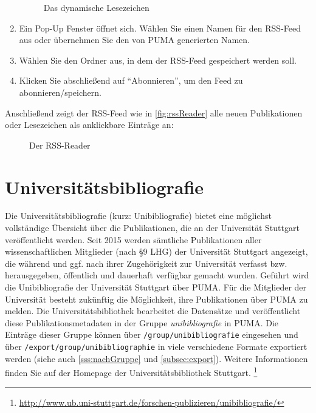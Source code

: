\begin{enumerate}
\begin{figure}[h!]
 \caption{Das dynamische Lesezeichen}
 \label{fig:dynamischesLesezeichen}
\end{figure}
    \item Ein Pop-Up Fenster öffnet sich. Wählen Sie einen Namen für den RSS-Feed aus oder übernehmen Sie den von PUMA generierten Namen. 
    \item Wählen Sie den Ordner aus, in dem der RSS-Feed gespeichert werden soll.
    \item Klicken Sie abschließend auf \enquote{Abonnieren}, um den Feed zu abonnieren/speichern.
\end{enumerate}
Anschließend zeigt der RSS-Feed wie in \autoref{fig:rssReader} alle neuen Publikationen oder Lesezeichen als anklickbare Einträge an:
\begin{figure}[h!]
 \centering
 \caption{Der RSS-Reader}
 \label{fig:rssReader}
\end{figure}
\section{Universitätsbibliografie}
\label{sec:unibibliografie}
Die Universitätsbibliografie (kurz: Unibibliografie) bietet eine möglichst vollständige Übersicht über die Publikationen, die an der Universität Stuttgart veröffentlicht werden. Seit 2015 werden sämtliche Publikationen aller wissenschaftlichen Mitglieder (nach §9 LHG) der Universität Stuttgart angezeigt, die während und ggf. nach ihrer Zugehörigkeit zur Universität verfasst bzw. herausgegeben, öffentlich und dauerhaft verfügbar gemacht wurden.\newline\newline
Geführt wird die Unibibliografie der Universität Stuttgart über PUMA. Für die Mitglieder der Universität besteht zukünftig die Möglichkeit, ihre Publikationen über PUMA zu melden. Die Universitätsbibliothek bearbeitet die Datensätze und veröffentlicht diese Publikationsmetadaten in der Gruppe \textit{unibibliografie} in PUMA. Die Einträge dieser Gruppe können über \texttt{/group/unibibliografie} eingesehen und über \texttt{/export/group/unibibliographie} in viele verschiedene Formate exportiert werden (siehe auch \autoref{sss:nachGruppe} und \autoref{subsec:export}). Weitere Informationen finden Sie auf der Homepage der Universitätsbibliothek Stuttgart. \footnote{\url{http://www.ub.uni-stuttgart.de/forschen-publizieren/unibibliografie/}}
